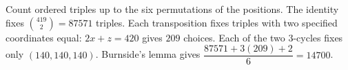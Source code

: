Count ordered triples up to the six permutations of the positions. The identity fixes $\binom{419}{2}=87571 $ triples. Each transposition fixes triples with two specified coordinates equal: $ 2x+z=420 $ gives $ 209 $ choices. Each of the two 3-cycles fixes only $(140,140,140)$. Burnside's lemma gives $\dfrac{87571+3(209)+2}{6}=\boxed{14700}$.
